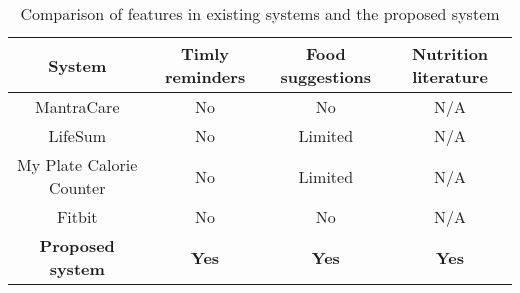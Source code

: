 \documentclass{article}
\begin{document}
\begin{table}[h]
\caption{Comparison of features in existing systems and the proposed system}
\begin{tabular}{|c|c|c|c|}
\hline
\textbf{System} & \textbf{Timly reminders} & \textbf{Food suggestions} & \textbf{Nutrition literature} \\ \hline
MantraCare & No & No & N/A \\ \hline
LifeSum & No & Limited & N/A \\ \hline
My Plate Calorie Counter & No & Limited & N/A \\ \hline
Fitbit & No & No & N/A \\ \hline
\textbf{Proposed system} & \textbf{Yes} & \textbf{Yes} & \textbf{Yes} \\ \hline
\end{tabular}
\end{table}




\end{document}
